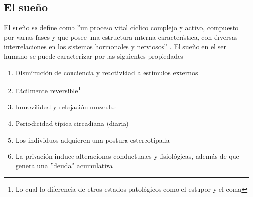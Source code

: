 
\subsection{El sue\~no}


El sue\~no se define como ''un proceso vital c\'iclico complejo y activo, compuesto por varias 
fases y que posee una estructura interna caracter\'istica, con diversas interrelaciones en los 
sistemas hormonales y nerviosos'' \cite{FernandezConde07}. 
El sue\~no en el ser humano se puede caracterizar por las siguientes propiedades\cite{CarrilloMora}
\begin{enumerate}
\item Disminuci\'on de conciencia y reactividad a est\'imulos externos
\item F\'acilmente reversible\footnote{Lo cual lo diferencia de otros estados 
patol\'ogicos como el estupor y el coma}
\item Inmovilidad y relajaci\'on muscular
\item Periodicidad t\'ipica circadiana (diaria)
\item Los individuos adquieren una postura estereotipada
\item La privaci\'on induce alteraciones conductuales y 
fisiol\'ogicas, adem\'as de que genera una ''deuda'' acumulativa
\end{enumerate}



